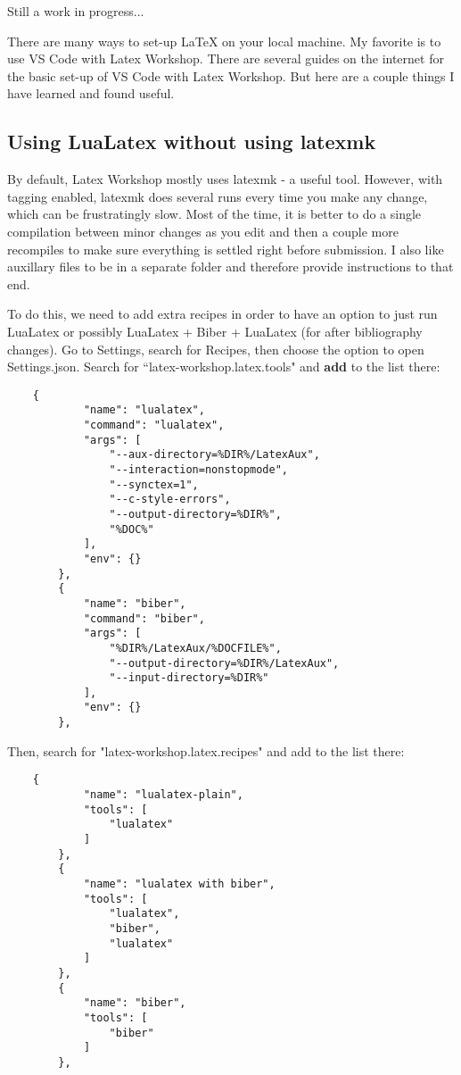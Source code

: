 \documentclass{article}
\begin{document}
Still a work in progress...

There are many ways to set-up LaTeX on your local machine.
My favorite is to use VS Code with Latex Workshop.
There are several guides on the internet for the basic set-up of VS Code with Latex Workshop.
But here are a couple things I have learned and found useful.

\subsection{Using LuaLatex without using latexmk}
By default, Latex Workshop mostly uses latexmk - a useful tool. However, with tagging enabled, latexmk does several runs every time you make any change, which can be frustratingly slow.
Most of the time, it is better to do a single compilation between minor changes as you edit and then a couple more recompiles to make sure everything is settled right before submission.
I also like auxillary files to be in a separate folder and therefore provide instructions to that end.

To do this, we need to add extra recipes in order to have an option to just run LuaLatex or possibly LuaLatex + Biber + LuaLatex (for after bibliography changes).
Go to Settings, search for Recipes, then choose the option to open Settings.json.
Search for ``latex-workshop.latex.tools" and \textbf{add} to the list there:
\begin{verbatim}
    {
            "name": "lualatex",
            "command": "lualatex",
            "args": [
                "--aux-directory=%DIR%/LatexAux",
                "--interaction=nonstopmode",
                "--synctex=1",
                "--c-style-errors",
                "--output-directory=%DIR%",
                "%DOC%"
            ],
            "env": {}
        },
        {
            "name": "biber",
            "command": "biber",
            "args": [
                "%DIR%/LatexAux/%DOCFILE%",
                "--output-directory=%DIR%/LatexAux",
                "--input-directory=%DIR%"
            ],
            "env": {}
        },
\end{verbatim}

Then, search for "latex-workshop.latex.recipes" and add to the list there:
\begin{samepage}
    \begin{verbatim}
    {
            "name": "lualatex-plain",
            "tools": [
                "lualatex"
            ]
        },
        {
            "name": "lualatex with biber",
            "tools": [
                "lualatex",
                "biber",
                "lualatex"
            ]
        },
        {
            "name": "biber",
            "tools": [
                "biber"
            ]
        },
\end{verbatim}
\end{samepage}
\end{document}
